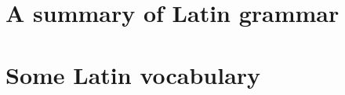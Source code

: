 \documentclass{ifacconf}
\begin{document}







\appendix
\section{A summary of Latin grammar}    %
\section{Some Latin vocabulary}              %
\end{document}
